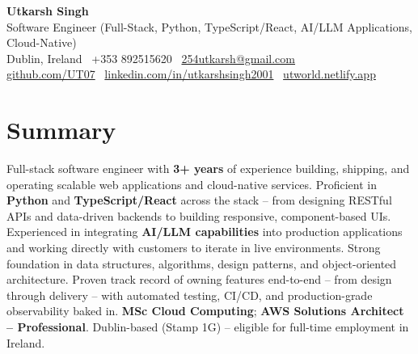 \documentclass[10pt,a4paper]{article}
\begin{document}
\begin{center}
{\Large \textbf{Utkarsh Singh}}\\[0.04em]
{\normalsize Software Engineer (Full-Stack, Python, TypeScript/React, AI/LLM Applications, Cloud-Native)}\\[0.08em]
Dublin, Ireland \textbar\ +353 892515620 \textbar\ \href{mailto:254utkarsh@gmail.com}{254utkarsh@gmail.com}\\[0.08em]
\href{https://github.com/UT07}{github.com/UT07} \textbar\
\href{https://www.linkedin.com/in/utkarshsingh2001/}{linkedin.com/in/utkarshsingh2001} \textbar\
\href{https://utworld.netlify.app}{utworld.netlify.app}
\end{center}
\vspace{0.06em}
\section*{Summary}
Full-stack software engineer with \textbf{3+ years} of experience building, shipping, and operating scalable web applications and cloud-native services. Proficient in \textbf{Python} and \textbf{TypeScript/React} across the stack -- from designing RESTful APIs and data-driven backends to building responsive, component-based UIs. Experienced in integrating \textbf{AI/LLM capabilities} into production applications and working directly with customers to iterate in live environments. Strong foundation in data structures, algorithms, design patterns, and object-oriented architecture. Proven track record of owning features end-to-end -- from design through delivery -- with automated testing, CI/CD, and production-grade observability baked in. \textbf{MSc Cloud Computing}; \textbf{AWS Solutions Architect -- Professional}. Dublin-based (Stamp 1G) -- eligible for full-time employment in Ireland.
\end{document}
